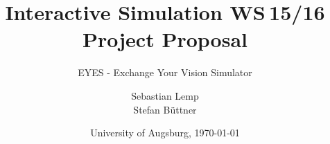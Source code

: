 \documentclass{acm_proc_article-sp}
\begin{document}
\title{
Interactive Simulation WS 15/16\\ %
Project Proposal
}
\subtitle{EYES - Exchange Your Vision Simulator}
\author{
\alignauthor
Sebastian Lemp\\
\alignauthor
Stefan Büttner\\
}

\date{University of Augsburg, \today}




\maketitle

\end{document}
